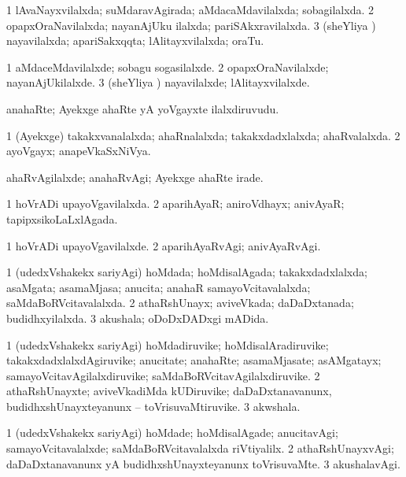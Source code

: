\bentry
{}
\gl{\gu}
\bmng
\bnum
\num{1} lAvaNayxvilalxda; suMdaravAgirada; aMdacaMdavilalxda; sobagilalxda. 
\num{2} opapxOraNavilalxda; nayanAjUku ilalxda; pariSAkxravilalxda. 
\num{3} (sheYliya \vi) nayavilalxda; apariSakxqqta; lAlitayxvilalxda; oraTu. 
\enum
\emng
\eentry

\bentry
{}
\gl{\kirxvi}
\bmng
\bnum
\num{1} aMdaceMdavilalxde; sobagu sogasilalxde. 
\num{2} opapxOraNavilalxde; nayanAjUkilalxde. 
\num{3} (sheYliya \vi) nayavilalxde; lAlitayxvilalxde. 
\enum
\emng
\eentry

\bentry
{}
\gl{\nA}
\bmng
anahaRte; Ayekxge ahaRte yA yoVgayxte ilalxdiruvudu. 
\emng
\eentry

\bentry
{}
\gl{\gu}
\bmng
\bnum
\num{1} (Ayekxge) takakxvanalalxda; ahaRnalalxda; takakxdadxlalxda; ahaRvalalxda. 
\num{2} ayoVgayx; anapeVkaSxNiVya. 
\enum
\emng
\eentry

\bentry
{}
\gl{\kirxvi}
\bmng
ahaRvAgilalxde; anahaRvAgi; Ayekxge ahaRte irade. 
\emng
\eentry

\bentry
{}
\gl{\gu}
\bmng
\bnum
\num{1} hoVrADi upayoVgavilalxda. 
\num{2} aparihAyaR; aniroVdhayx; anivAyaR; tapipxsikoLaLxlAgada. 
\enum
\emng
\eentry

\bentry
{}
\gl{\kirxvi}
\bmng
\bnum
\num{1} hoVrADi upayoVgavilalxde. 
\num{2} aparihAyaRvAgi; anivAyaRvAgi. 
\enum
\emng
\eentry

\bentry
{}
\gl{\gu}
\bmng
\bnum
\num{1} (udedxVshakekx sariyAgi) hoMdada; hoMdisalAgada; takakxdadxlalxda; asaMgata; asamaMjasa; anucita; anahaR samayoVcitavalalxda; saMdaBoRVcitavalalxda. 
\num{2} athaRshUnayx; aviveVkada; daDaDxtanada; budidhxyilalxda. 
\num{3} akushala; oDoDxDADxgi mADida. 
\enum
\emng
\eentry

\bentry
{}
\gl{\nA}
\bmng
\bnum
\num{1} (udedxVshakekx sariyAgi) hoMdadiruvike; hoMdisalAradiruvike; takakxdadxlalxdAgiruvike; anucitate; anahaRte; asamaMjasate; asAMgatayx; samayoVcitavAgilalxdiruvike; saMdaBoRVcitavAgilalxdiruvike. 
\num{2} athaRshUnayxte; aviveVkadiMda kUDiruvike; daDaDxtanavanunx, budidhxshUnayxteyanunx -- toVrisuvaMtiruvike. 
\num{3} akwshala. 
\enum
\emng
\eentry

\bentry
{}
\gl{\kirxvi}
\bmng
\bnum
\num{1} (udedxVshakekx sariyAgi) hoMdade; hoMdisalAgade; anucitavAgi; samayoVcitavalalxde; saMdaBoRVcitavalalxda riVtiyalilx. 
\num{2} athaRshUnayxvAgi; daDaDxtanavanunx yA budidhxshUnayxteyanunx toVrisuvaMte. 
\num{3} akushalavAgi. 
\enum
\emng
\eentry


